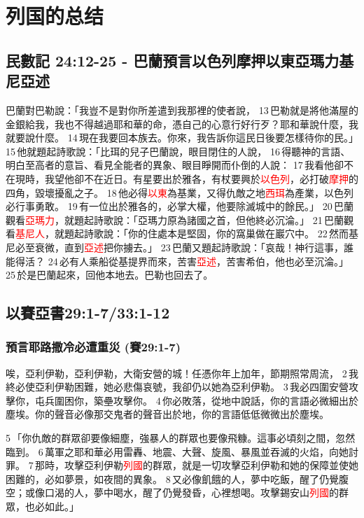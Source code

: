 
\section{列国的总结}
\subsection{民數記 24:12-25 - 巴蘭預言以色列摩押以東亞瑪力基尼亞述}
巴蘭對巴勒說：「我豈不是對你所差遣到我那裡的使者說， 13 巴勒就是將他滿屋的金銀給我，我也不得越過耶和華的命，憑自己的心意行好行歹？耶和華說什麼，我就要說什麼。 14 現在我要回本族去。你來，我告訴你這民日後要怎樣待你的民。」 15 他就題起詩歌說：「比珥的兒子巴蘭說，眼目閉住的人說， 16 得聽神的言語、明白至高者的意旨、看見全能者的異象、眼目睜開而仆倒的人說： 17 我看他卻不在現時，我望他卻不在近日。有星要出於雅各，有杖要興於\textcolor{red}{以色列}，必打破\textcolor{red}{摩押}的四角，毀壞擾亂之子。 18 他必得\textcolor{red}{以東}為基業，又得仇敵之地\textcolor{red}{西珥}為產業，以色列必行事勇敢。 19 有一位出於雅各的，必掌大權，他要除滅城中的餘民。」 20 巴蘭觀看\textcolor{red}{亞瑪力}，就題起詩歌說：「亞瑪力原為諸國之首，但他終必沉淪。」 21 巴蘭觀看\textcolor{red}{基尼人}，就題起詩歌說：「你的住處本是堅固，你的窩巢做在巖穴中。 22 然而基尼必至衰微，直到\textcolor{red}{亞述}把你擄去。」 23 巴蘭又題起詩歌說：「哀哉！神行這事，誰能得活？ 24 必有人乘船從基提界而來，苦害\textcolor{red}{亞述}，苦害希伯，他也必至沉淪。」 25 於是巴蘭起來，回他本地去。巴勒也回去了。

\subsection{以賽亞書29:1-7/33:1-12}
\subsubsection{預言耶路撒冷必遭重災 (賽29:1-7)}
唉，亞利伊勒，亞利伊勒，大衛安營的城！任憑你年上加年，節期照常周流， 2 我終必使亞利伊勒困難，她必悲傷哀號，我卻仍以她為亞利伊勒。 3 我必四圍安營攻擊你，屯兵圍困你，築壘攻擊你。 4 你必敗落，從地中說話，你的言語必微細出於塵埃。你的聲音必像那交鬼者的聲音出於地，你的言語低低微微出於塵埃。

5 「你仇敵的群眾卻要像細塵，強暴人的群眾也要像飛糠。這事必頃刻之間，忽然臨到。 6 萬軍之耶和華必用雷轟、地震、大聲、旋風、暴風並吞滅的火焰，向她討罪。 7 那時，攻擊亞利伊勒\textcolor{red}{列國}的群眾，就是一切攻擊亞利伊勒和她的保障並使她困難的，必如夢景，如夜間的異象。 8 又必像飢餓的人，夢中吃飯，醒了仍覺腹空；或像口渴的人，夢中喝水，醒了仍覺發昏，心裡想喝。攻擊錫安山\textcolor{red}{列國}的群眾，也必如此。」


